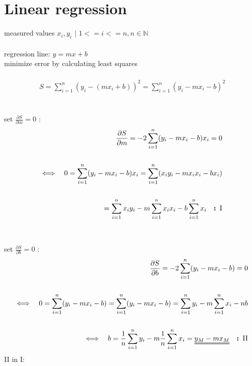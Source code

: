 \documentclass[a4paper]{article}
\begin{document}
\section{Linear regression}
measured values $x_i,y_i$ $|$ $1<=i<=n, n\in \mathbb{N}$
\\\\
regression line: $y=mx+b$\\
minimize error by calculating least squares
\\\\
\begin{align*}
S=\sum_{i=1}^{n}(y_i-(mx_i+b))^2=\sum_{i=1}^{n}(y_i-mx_i-b)^2
\end{align*}
\\\\
set $\frac{\partial S}{\partial m}=0$ :
\begin{align*}
\frac{\partial S}{\partial m}=-2\sum_{i=1}^{n}(y_i-mx_i-b)x_i=0
\\\\
\Longleftrightarrow \quad 0=\sum_{i=1}^{n}(y_i-mx_i-b)x_i=\sum_{i=1}^{n}(x_iy_i-mx_ix_i-bx_i)
\\\\
=\sum_{i=1}^{n}x_iy_i-m\sum_{i=1}^{n}x_ix_i-b\sum_{i=1}^{n}x_i \quad \textbf{: \rm I}
\end{align*}
\\\\
set $\frac{\partial S}{\partial b}=0$ :
\begin{align*}
\frac{\partial S}{\partial b}=-2\sum_{i=1}^{n}(y_i-mx_i-b)=0
\\\\
\Longleftrightarrow \quad 0=\sum_{i=1}^{n}(y_i-mx_i-b)=\sum_{i=1}^{n}(y_i-mx_i-b)=\sum_{i=1}^{n}y_i-m\sum_{i=1}^{n}x_i-nb
\\\\
\Longleftrightarrow \quad b=\frac{1}{n}\sum_{i=1}^{n}y_i-m\frac{1}{n}\sum_{i=1}^{n}x_i=\uuline{y_M-mx_M} \quad \textbf{: \rm II}
\end{align*}
\rm{II} in \rm{I}:
\end{document}
